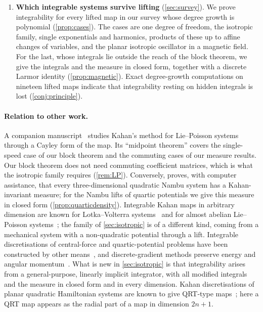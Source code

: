 \documentclass[11pt,a4paper]{article}
\theoremstyle{definition}
\theoremstyle{remark}
\begin{document}
\begin{enumerate}[leftmargin=*,label=(\roman*)]
  function sampled at equal steps, which gives an explicit solution (\cref{thm:radial,cor:explicit-solution}).
  The map can be evaluated in closed form at $O(n)$ cost (\cref{rem:explicit}), and bounded orbits are guaranteed
  under an explicit condition (\cref{prop:bounded}). On a stiff test problem it is far more accurate than
  St\"ormer--Verlet at the same cost; at small amplitudes it stays stable well beyond the St\"ormer--Verlet limit,
  without the resonance bands of splitting methods, while at large amplitudes and step sizes it can fail
  (\cref{sec:numerics}).
\item \textbf{Which integrable systems survive lifting} (\cref{sec:survey}). We prove integrability for every
  lifted map in our survey whose degree growth is polynomial (\cref{prop:cases}). The cases are one degree of
  freedom, the isotropic family, single exponentials and harmonics, products of these up to affine changes of
  variables, and the planar isotropic oscillator in a magnetic field. For the last, whose integrals lie outside
  the reach of the block theorem, we give the integrals and the measure in closed form, together with a discrete
  Larmor identity (\cref{prop:magnetic}). Exact degree-growth computations on nineteen lifted maps indicate
  that integrability resting on hidden integrals is lost (\cref{conj:principle}).
\end{enumerate}

\paragraph{Relation to other work.}
A companion manuscript~\cite{LP} studies Kahan's method for Lie--Poisson systems through a Cayley form of the
map. Its ``midpoint theorem'' covers the single-speed case of our block theorem and the commuting cases of
our measure results. Our block theorem does not need commuting coefficient matrices, which is what the
isotropic family requires (\cref{rem:LP}). Conversely, \cite{LP} proves, with computer assistance, that every
three-dimensional quadratic Nambu system has a Kahan-invariant measure; for the Nambu lifts of quartic potentials
we give this measure in closed form (\cref{prop:quarticdensity}). Integrable Kahan maps
in arbitrary dimension are known for Lotka--Volterra systems~\cite{KQV16,vdKMMQ24} and for almost abelian
Lie--Poisson systems~\cite{LP}; the family of \cref{sec:isotropic} is of a different kind, coming from a
mechanical system with a non-quadratic potential through a lift. Integrable discretisations of central-force
and quartic-potential problems have been constructed by other
means~\cite{MinesakiNakamura02,FengMaruno08,Suris03}, and discrete-gradient methods preserve energy and
angular momentum~\cite{MQR99}. What is new in \cref{sec:isotropic} is that integrability arises from a
general-purpose, linearly implicit integrator, with all modified integrals and the measure in closed form and
in every dimension. Kahan discretisations of planar quadratic Hamiltonian systems are known to give QRT-type
maps~\cite{PSS19,GMQ24}; here a QRT map appears as the radial part of a map in dimension $2n+1$.
\end{document}
